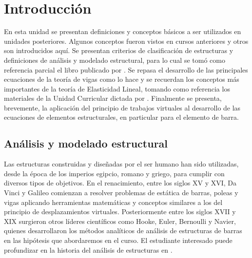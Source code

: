 %
%
%
%

\chapter[Introducción]{Introducción}

En esta unidad se presentan definiciones y conceptos básicos a ser utilizados en unidades posteriores. %
%
Algunos conceptos fueron vistos en cursos anteriores y otros son introducidos aquí. %
%
Se presentan criterios de clasificación de estructuras y definiciones de análisis y modelado estructural, para lo cual se tomó como referencia parcial el libro publicado por \cite{Hibbeler2012}. %
%
Se repasa el desarrollo de las principales ecuaciones de la teoría de vigas como lo hace \cite{Timoshenko1940a} y se recuerdan los conceptos más importantes de la teoría de Elasticidad Lineal, tomando como referencia los materiales de la Unidad Curricular dictada por \cite{CanelasElasticidad}. %
%
Finalmente se presenta, brevemente, la aplicación del principio de trabajos virtuales al desarrollo de las ecuaciones de elementos estructurales, en particular para el elemento de barra.
%

\section{Análisis y modelado estructural}

Las estructuras construidas y diseñadas por el ser humano han sido utilizadas, desde la época de los imperios egipcio, romano y griego, para cumplir con diversos tipos de objetivos. %
%
En el renacimiento, entre los siglos XV y XVI, Da Vinci y Galileo comienzan a resolver problemas de estática de barras, poleas y vigas aplicando herramientas matemáticas y conceptos similares a los del principio de desplazamientos virtuales. %
%
Posteriormente entre los siglos XVII y XIX surgieron otros líderes científicos como Hooke, Euler, Bernoulli y Navier, quienes desarrollaron los métodos analíticos de análisis de estructuras de barras en las hipótesis que abordaremos en el curso. %
%
El estudiante interesado puede profundizar en la historia del análisis de estructuras en \citep{Timoshenko1953}. %

